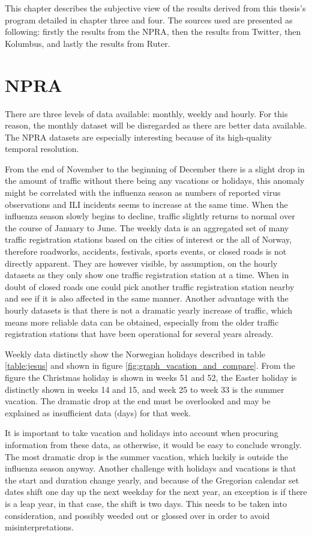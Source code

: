 This chapter describes the subjective view of the results derived from this thesis's program detailed in chapter three and four. The sources used are presented as following: firstly the results from the NPRA, then the results from Twitter, then Kolumbus, and lastly the results from Ruter. %

\section{NPRA}
There are three levels of data available: monthly, weekly and hourly. For this reason, the monthly dataset will be disregarded as there are better data available. The NPRA datasets are especially interesting because of its high-quality temporal resolution.

From the end of November to the beginning of December there is a slight drop in the amount of traffic without there being any vacations or holidays, this anomaly might be correlated with the influenza season as numbers of reported virus observations and ILI incidents seems to increase at the same time. When the influenza season slowly begins to decline, traffic slightly returns to normal over the course of January to June. The weekly data is an aggregated set of many traffic registration stations based on the cities of interest or the all of Norway, therefore roadworks, accidents, festivals, sports events, or closed roads is not directly apparent. They are however visible, by assumption, on the hourly datasets as they only show one traffic registration station at a time. When in doubt of closed roads one could pick another traffic registration station nearby and see if it is also affected in the same manner. Another advantage with the hourly datasets is that there is not a dramatic yearly increase of traffic, which means more reliable data can be obtained, especially from the older traffic registration stations that have been operational for several years already.

Weekly data distinctly show the Norwegian holidays described in table \ref{table:jesus} and shown in figure \ref{fig:graph_vacation_and_compare}. From the figure the Christmas holiday is shown in weeks 51 and 52, the Easter holiday is distinctly shown in weeks 14 and 15, and week 25 to week 33 is the summer vacation. The dramatic drop at the end must be overlooked and may be explained as insufficient data (days) for that week. 

It is important to take vacation and holidays into account when procuring information from these data, as otherwise, it would be easy to conclude wrongly. The most dramatic drop is the summer vacation, which luckily is outside the influenza season anyway. 
Another challenge with holidays and vacations is that the start and duration change yearly, and because of the Gregorian calendar set dates shift one day up the next weekday for the next year, an exception is if there is a leap year, in that case, the shift is two days. This needs to be taken into consideration, and possibly weeded out or glossed over in order to avoid misinterpretations.

